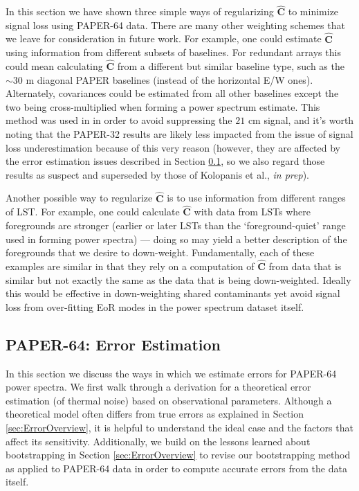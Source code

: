 \documentclass[preprint2,numberedappendix,tighten]{aastex6}  %
\begin{document}
In this section we have shown three simple ways of regularizing $\hat{\textbf{C}}$ to minimize signal loss using PAPER-64 
data. There are many other weighting schemes that we leave for consideration in future work. For example, one could estimate 
$\hat{\textbf{C}}$ using information from different subsets of baselines. For redundant arrays this could mean calculating $
\hat{\textbf{C}}$ from a different but similar baseline type, such as the $\sim30$ m diagonal PAPER baselines (instead of the 
horizontal E/W ones). Alternately, covariances could be estimated from all other baselines except the two being cross-multiplied 
when forming a power spectrum estimate. This method was used in \citet{parsons_et_al2014} in order to avoid suppressing the 
$21$ cm signal, and it's worth noting that the PAPER-32 results are likely less impacted from the issue of signal loss underestimation 
because of this very reason (however, they are affected by the error estimation issues described in Section \ref{sec:Error}, so 
we also regard those results as suspect and superseded by those of Kolopanis et al., \textit{in prep}).

Another possible way to regularize $\hat{\textbf{C}}$ is to use information from different ranges of LST. For example, one could 
calculate $\hat{\textbf{C}}$ with data from LSTs where foregrounds are stronger (earlier or later LSTs than the `foreground-quiet' range used in forming power spectra) --- doing so may yield a better description of the foregrounds that we desire to 
down-weight. Fundamentally, each of these examples are similar in that they rely on a computation of $\hat{\textbf{C}}$ from 
data that is similar but not exactly the same as the data that is being down-weighted. Ideally this would be effective in down-weighting shared contaminants yet avoid signal loss from over-fitting EoR modes in the power spectrum dataset itself. 


\subsection{PAPER-64: Error Estimation}
\label{sec:Error}

In this section we discuss the ways in which we estimate errors for PAPER-64 power spectra. We first walk through a derivation 
for a theoretical error estimation (of thermal noise) based on observational parameters. Although a theoretical model often 
differs from true errors as explained in Section \ref{sec:ErrorOverview}, it is helpful to understand the ideal case and the factors 
that affect its sensitivity. Additionally, we build on the lessons learned about bootstrapping in Section \ref{sec:ErrorOverview} to 
revise our bootstrapping method as applied to PAPER-64 data in order to compute accurate errors from the data itself.
\end{document}
